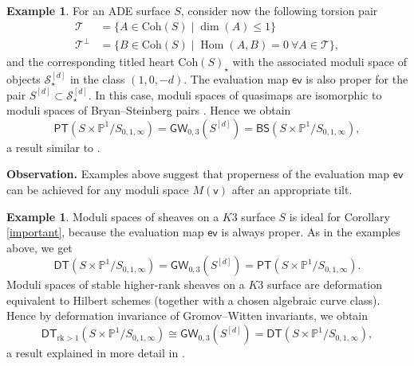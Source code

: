 \documentclass[11pt, reqno]{amsart}
\theoremstyle{plain}
\theoremstyle{definition}
\newtheorem{example}[thm]{Example}
\theoremstyle{remark}
\newcommand{\CS}{{\mathcal S}}
\newcommand{\CT}{{\mathcal T}}
\newcommand{\vsf}{{\mathsf{v}}}
\newcommand{\rk}{{\mathrm{rk}}}
\newcommand{\Cohc}{\mathrm{Coh}}
\newcommand\Hom{\operatorname{Hom}}
\newcommand{\p}{\mathbb{P}}
\newcommand{\evsf}{{\mathsf{ev}}}
\begin{document}
\begin{example} For an ADE surface $S$, consider now the following torsion pair 
	\begin{align*}
		\CT&=\{A \in \Cohc(S) \mid \dim(A)\leq 1\}  \\
		\CT^{\perp}&=\{B \in \Cohc(S) \mid \Hom(A,B)=0 \ \forall A \in \CT\},
	\end{align*}
and the corresponding titled heart $\Cohc(S)_{\star}$ with the  associated moduli space of objects $\CS_{ \star}^{[d]}$ in the class $(1,0,-d)$. The evaluation map $\evsf$ is also proper for the pair $S^{[d]} \subset \CS_{\star}^{[d]}$. In this case, moduli spaces of quasimaps are isomorphic to moduli spaces of Bryan--Steinberg pairs \cite{BS}. Hence we obtain 
	\[  \mathsf{PT}(S\times \p^1/ S_{ 0,1,\infty})=\mathsf{GW}_{0,3}(S^{[d]})= \mathsf{BS}(S\times \p^1/ S_{0,1,\infty}),\] 
a result similar to \cite{Liu}. 
	\end{example}
\vspace{0.4cm}
\noindent\textbf{Observation.} Examples above suggest  that properness of the evaluation map $\evsf$ can be achieved for any moduli space $M(\vsf)$ after an appropriate tilt.
\\

\begin{example} Moduli spaces of sheaves on a $K3$ surface $S$ is ideal for Corollary \ref{important}, because the evaluation map $\evsf$ is always proper. As in the examples above, we get
\[   \mathsf{DT}(S\times \p^1/ S_{0,1,\infty})=\mathsf{GW}_{0,3}(S^{[d]})= \mathsf{PT}(S\times \p^1/ S_{0,1,\infty}).\] 
Moduli spaces of stable higher-rank sheaves on a $K3$ surface are deformation equivalent to Hilbert schemes (together with a chosen algebraic curve class). Hence by deformation invariance of Gromov--Witten invariants, we obtain 
\[ \mathsf{DT}_{\rk>1}(S\times \p^1/ S_{0,1,\infty})\cong\mathsf{GW}_{0,3}(S^{[d]})=\mathsf{DT}(S\times \p^1/ S_{0,1,\infty}), \] 
a result explained in more detail in \cite{NK3}. 
\end{example}
\end{document}
